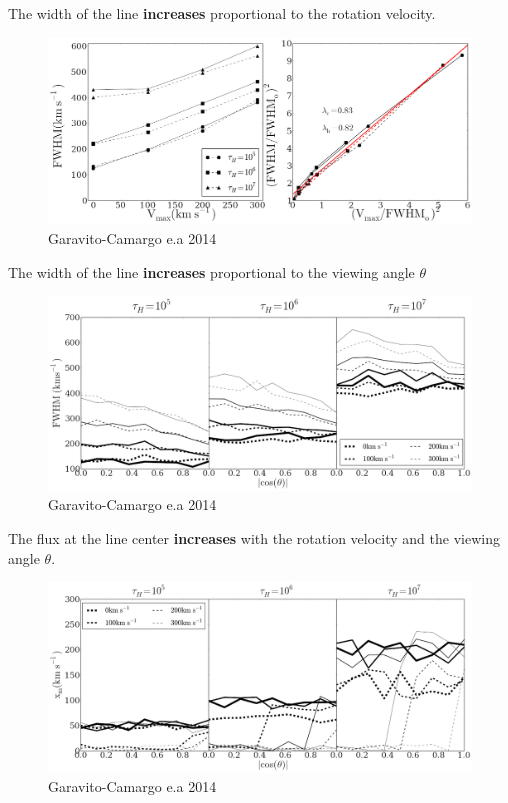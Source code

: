 \documentclass{beamer}
\begin{document}


\begin{frame}{The width of the line \textbf{increases} proportional to the rotation velocity.}
\begin{figure}
\includegraphics[scale=0.26]{Figures/f7.png}
\caption*{Garavito-Camargo e.a 2014}
\end{figure}
\end{frame}


\begin{frame}{The width of the line \textbf{increases} proportional to the viewing angle $\theta$}
\begin{figure}
\includegraphics[scale=0.23]{Figures/f6.png}
\caption*{Garavito-Camargo e.a 2014}
\end{figure}
\end{frame}

\begin{frame}{The flux at the line center \textbf{increases} with the rotation velocity and the viewing angle $\theta$.}
\begin{figure}
\includegraphics[scale=0.23]{Figures/f8.png}
\caption*{Garavito-Camargo e.a 2014}
\end{figure}
\end{frame}
\end{document}
